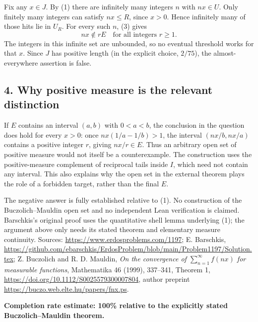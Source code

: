 Fix any $x\in J$. By (1) there are infinitely many integers $n$ with $nx\in U$. Only finitely many integers can satisfy $nx\le R$, since $x>0$. Hence infinitely many of those hits lie in $U_R$. For every such $n$, (3) gives
\[
 nx\notin rE\quad\text{for all integers }r\ge1.
\]
The integers in this infinite set are unbounded, so no eventual threshold works for that $x$. Since $J$ has positive length (in the explicit choice, $2/75$), the almost-everywhere assertion is false.

\subsection*{4. Why positive measure is the relevant distinction}
If $E$ contains an interval $(a,b)$ with $0<a<b$, the conclusion in the question does hold for every $x>0$: once $nx(1/a-1/b)>1$, the interval $(nx/b,nx/a)$ contains a positive integer $r$, giving $nx/r\in E$. Thus an arbitrary open set of positive measure would not itself be a counterexample. The construction uses the positive-measure complement of reciprocal tails inside $I$, which need not contain any interval. This also explains why the open set in the external theorem plays the role of a forbidden target, rather than the final $E$.

The negative answer is fully established relative to (1). No construction of the Buczolich--Mauldin open set and no independent Lean verification is claimed. Barschkis's original proof uses the quantitative shell lemma underlying (1); the argument above only needs its stated theorem and elementary measure continuity.
Sources: \url{https://www.erdosproblems.com/1197}; E. Barschkis, \url{https://github.com/ebarschkis/ErdosProblem/blob/main/Problem1197/Solution.tex}; Z. Buczolich and R. D. Mauldin, \emph{On the convergence of $\sum_{n=1}^{\infty}f(nx)$ for measurable functions}, Mathematika 46 (1999), 337--341, Theorem 1, \url{https://doi.org/10.1112/S0025579300007804}, author preprint \url{https://buczo.web.elte.hu/papers/fnx.ps}.

\textbf{Completion rate estimate: 100\% relative to the explicitly stated Buczolich--Mauldin theorem.}
